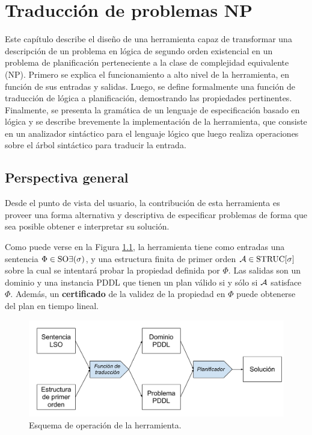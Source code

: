 
\chapter{Traducción de problemas NP}
\label{Chapter2}
Este capítulo describe el diseño de una herramienta capaz de transformar una
descripción de un problema en lógica de segundo orden existencial
en un problema de planificación perteneciente a la clase de complejidad
equivalente (NP).
Primero se explica el funcionamiento a alto nivel de la herramienta, en función
de sus entradas y salidas. Luego, se define formalmente una función de
traducción de lógica a planificación, demostrando las propiedades pertinentes.
Finalmente, se presenta la gramática de un lenguaje de especificación basado en lógica 
y se describe brevemente la implementación de la herramienta, que consiste en un 
analizador sintáctico para el lenguaje lógico que luego realiza operaciones
sobre el árbol sintáctico para traducir la entrada.

\section{Perspectiva general}
Desde el punto de vista del usuario, la contribución de esta herramienta es
proveer una forma alternativa y descriptiva de especificar problemas de forma
que sea posible obtener e interpretar su solución.

Como puede verse en la Figura \ref{esquema_herramienta}, la herramienta tiene
como entradas una sentencia $\Phi\in\text{SO}\exists(\sigma)$, y
una estructura finita de primer orden $\mathcal{A}\in\text{STRUC}[\sigma]$ sobre la cual se
intentará probar la propiedad definida por $\Phi$.
Las salidas son un dominio y una instancia PDDL que tienen un plan válido si y
sólo si $\mathcal{A}$ satisface $\Phi$. Además, un \textbf{certificado} de la validez de
la propiedad en $\Phi$ puede obtenerse del plan en tiempo lineal.

\begin{figure}[h]
\centering
\includegraphics[width=\textwidth]{figuras/esquema_herramienta.pdf}
\caption{Esquema de operación de la herramienta.}
\label{esquema_herramienta}
\end{figure}

